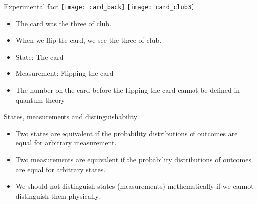 \documentclass{beamer}
\newcommand{\cmark}{\ding{51}}%
\newcommand{\xmark}{\ding{55}}%
\newcommand\emm[1]{\textcolor{redorange}{{#1}}}
\theoremstyle{definition}
\begin{document}
\begin{frame}{Experimental fact}
\texttt{[image: card\_back]}
\hfill
\texttt{[image: card\_club3]}

\vspace{1em}
\begin{itemize}
\item \textcolor{red}{\xmark}\; The card was the three of club.
\item \textcolor{green}{\cmark}\; When we flip the card, we see the three of club.
\end{itemize}
\begin{itemize}
\item State: The card
\item Measurement: Flipping the card
\item The number on the card before the flipping the card \emm{cannot be defined} in quantum theory
\end{itemize}
\end{frame}

\begin{frame}{States, measurements and distinguishability}
\begin{itemize}
\setlength{\itemsep}{2em}
\item Two states are equivalent if the probability distributions of outcomes are equal for \emm{arbitrary measurement}.
\item Two measurements are equivalent if the probability distributions of outcomes are equal for \emm{arbitrary states}.
\item \emm{We should not distinguish states (measurements) methematically if we cannot distinguish them physically}.
\end{itemize}
\end{frame}
\end{document}
